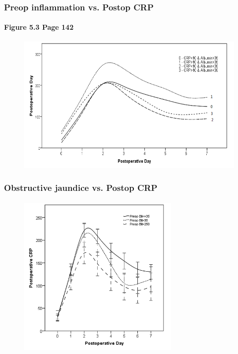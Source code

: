 \documentclass[10pt]{beamer}
\begin{document}
\begin{frame}
	\frametitle{Preop inflammation vs. Postop CRP}
	\framesubtitle{Figure 5.3 Page 142}
	\begin{figure}
		\includegraphics[width=\textwidth]{../Figures/sirs_crp_crp_alb}
	\end{figure}
\end{frame}

\begin{frame}
	\frametitle{Obstructive jaundice vs. Postop CRP}
	\framesubtitle{ }
	\begin{figure}
		\includegraphics[width=0.7\textwidth]{../Figures/sirs_bil_crp}
	\end{figure}

\end{frame}
\end{document}
